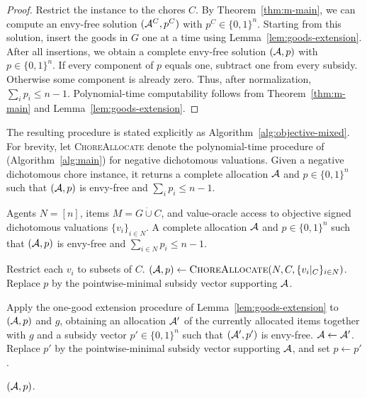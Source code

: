 \begin{proof}
Restrict the instance to the chores $C$. By Theorem~\ref{thm:m-main}, we can
compute an envy-free solution $(\mathcal{A}^C,p^C)$ with $p^C\in\{0,1\}^n$. Starting
from this solution, insert the goods in $G$ one at a time using
Lemma~\ref{lem:goods-extension}. After all insertions, we obtain a complete
envy-free solution $(\mathcal{A},p)$ with $p\in\{0,1\}^n$. If every component of $p$
equals one, subtract one from every subsidy. Otherwise some component is already
zero. Thus, after normalization, $\sum_i p_i\le n-1$. Polynomial-time
computability follows from Theorem~\ref{thm:m-main} and
Lemma~\ref{lem:goods-extension}.
\end{proof}

The resulting procedure is stated explicitly as Algorithm~\ref{alg:objective-mixed}.
For brevity, let \textsc{ChoreAllocate} denote the polynomial-time procedure of
 (Algorithm~\ref{alg:main}) for negative dichotomous valuations.
Given a negative dichotomous chore instance, it returns a complete allocation
$\mathcal{A}$ and $p\in\{0,1\}^n$ such that $(\mathcal{A},p)$ is envy-free and
$\sum_i p_i\le n-1$.

\begin{algorithm}[H]
\caption{Unit subsidies for objective signed dichotomous valuations}
\label{alg:objective-mixed}
\begin{algorithmic}[1]
\Require Agents $N=[n]$, items $M=G\mathbin{\dot\cup}C$, and value-oracle access
  to objective signed dichotomous valuations $\{v_i\}_{i\in N}$.
\Ensure A complete allocation $\mathcal{A}$ and $p\in\{0,1\}^n$ such that
  $(\mathcal{A},p)$ is envy-free and $\sum_{i\in N}p_i\le n-1$.

\State Restrict each $v_i$ to subsets of $C$.
\State $(\mathcal{A},p)\gets\textsc{ChoreAllocate}(N,C,\{v_i|_C\}_{i\in N})$.
\State Replace $p$ by the pointwise-minimal subsidy vector supporting $\mathcal{A}$.

    \State Apply the one-good extension procedure of
      Lemma~\ref{lem:goods-extension} to $(\mathcal{A},p)$ and $g$, obtaining an
      allocation $\mathcal{A}'$ of the currently allocated items together with $g$
      and a subsidy vector $p'\in\{0,1\}^n$ such that $(\mathcal{A}',p')$ is
      envy-free.
    \State $\mathcal{A}\gets\mathcal{A}'$.
    \State Replace $p'$ by the pointwise-minimal subsidy vector supporting
      $\mathcal{A}$, and set $p\gets p'$.
\EndFor

\State \Return $(\mathcal{A},p)$.
\end{algorithmic}
\end{algorithm}

